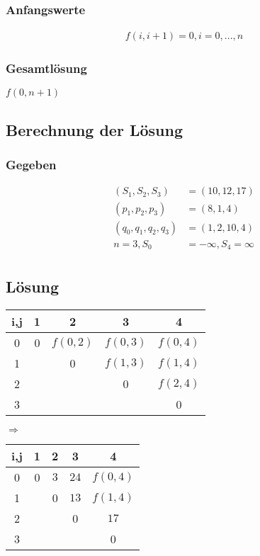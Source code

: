 \documentclass[ngerman,a4paper]{report}
\begin{document}
\subsubsection*{Anfangswerte}
\begin{align*}
f(i, i+1) = 0, i = 0,...,n
\end{align*}
\subsubsection*{Gesamtlösung}
$f(0,n+1)$ 

\subsection*{Berechnung der Lösung}
\subsubsection*{Gegeben}
\begin{align*}
(S_1,S_2,S_3) &= (10, 12, 17)\\
(p_1,p_2,p_3) &= (8, 1, 4)\\
(q_0,q_1,q_2,q_3) &= (1, 2, 10, 4)\\
n = 3, S_0 &= -\infty, S_4 = \infty\\
\end{align*}
\subsection*{Lösung}
\begin{tabular}{|c||c|c|c|c|}
\hline
i,j &1 & 2 & 3 & 4  \\
\hline
\hline
0&  0& $f(0,2)$ & $f(0,3)$ & $f(0,4)$ \\
\hline
1&  & 0 & $f(1,3)$ & $f(1,4)$  \\
\hline
2&  &  & 0 &$f(2,4)$\\
\hline
3&  &  &  & 0  \\
\hline
\end{tabular}
$\Rightarrow$
\begin{tabular}{|c||c|c|c|c|}
\hline
i,j &1 & 2 & 3 & 4  \\
\hline
\hline
0&  0& $3$ & $24$ & $f(0,4)$ \\
\hline
1&  & 0 & $13$ & $f(1,4)$  \\
\hline
2&  &  & 0 &$17$\\
\hline
3&  &  &  & 0  \\
\hline
\end{tabular}
\end{document}
